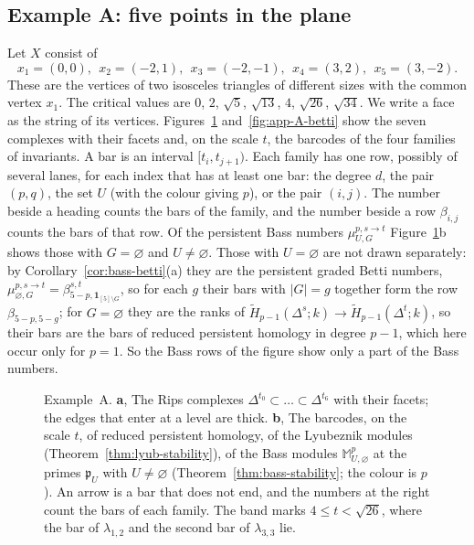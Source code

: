 \documentclass[11pt]{article}
\theoremstyle{plain}
\theoremstyle{definition}
\begin{document}
\subsection{Example A: five points in the plane}\label{app:exA}

Let $X$ consist of
\[
 x_1=(0,0),\ \ x_2=(-2,1),\ \ x_3=(-2,-1),\ \ x_4=(3,2),\ \ x_5=(3,-2).
\]
These are the vertices of two isosceles triangles of different sizes with the common vertex $x_1$. The critical values are $0$, $2$, $\sqrt5$, $\sqrt{13}$, $4$, $\sqrt{26}$, $\sqrt{34}$. We write a face as the string of its vertices. Figures~\ref{fig:app-A} and~\ref{fig:app-A-betti} show the seven complexes with their facets and, on the scale $t$, the barcodes of the four families of invariants. A bar is an interval $[t_i,t_{j+1})$. Each family has one row, possibly of several lanes, for each index that has at least one bar: the degree $d$, the pair $(p,q)$, the set $U$ (with the colour giving $p$), or the pair $(i,j)$. The number beside a heading counts the bars of the family, and the number beside a row $\beta_{i,j}$ counts the bars of that row. Of the persistent Bass numbers $\mu^{p,s\to t}_{U,G}$ Figure~\ref{fig:app-A}b shows those with $G=\varnothing$ and $U\ne\varnothing$. Those with $U=\varnothing$ are not drawn separately: by Corollary~\ref{cor:bass-betti}(a) they are the persistent graded Betti numbers, $\mu^{p,s\to t}_{\varnothing,G}=\beta^{s,t}_{5-p,\mathbf 1_{[5]\setminus G}}$, so for each $g$ their bars with $|G|=g$ together form the row $\beta_{5-p,5-g}$; for $G=\varnothing$ they are the ranks of $\widetilde H_{p-1}(\Delta^s;k)\to\widetilde H_{p-1}(\Delta^t;k)$, so their bars are the bars of reduced persistent homology in degree $p-1$, which here occur only for $p=1$. So the Bass rows of the figure show only a part of the Bass numbers.

\begin{figure}[htbp]
\centering
{}
\caption{Example~A. \textbf{a}, The Rips complexes $\Delta^{t_0}\subset\dots\subset\Delta^{t_6}$ with their facets; the edges that enter at a level are thick. \textbf{b}, The barcodes, on the scale $t$, of reduced persistent homology, of the Lyubeznik modules (Theorem~\ref{thm:lyub-stability}), of the Bass modules $\mathbb M^p_{U,\varnothing}$ at the primes $\mathfrak p_U$ with $U\ne\varnothing$ (Theorem~\ref{thm:bass-stability}; the colour is $p$). An arrow is a bar that does not end, and the numbers at the right count the bars of each family. The band marks $4\le t<\sqrt{26}$, where the bar of $\lambda_{1,2}$ and the second bar of $\lambda_{3,3}$ lie.}\label{fig:app-A}
\end{figure}
\end{document}
